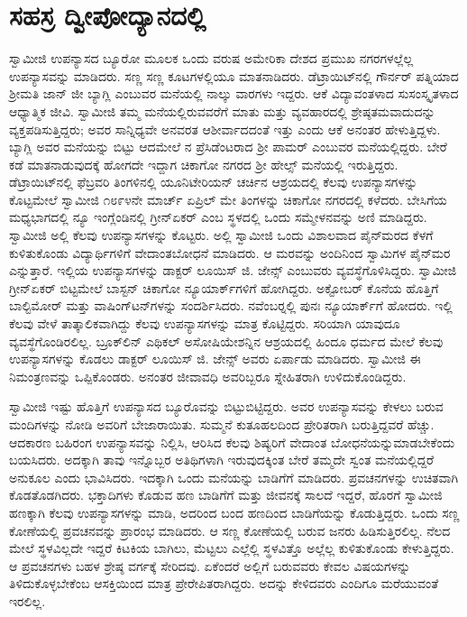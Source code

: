 
\chapter{ಸಹಸ್ರ ದ್ವೀಪೋದ್ಯಾನದಲ್ಲಿ}

 ಸ್ವಾಮೀಜಿ ಉಪನ್ಯಾಸದ ಬ್ಯೂರೋ ಮೂಲಕ ಒಂದು ವರುಷ ಅಮೇರಿಕಾ ದೇಶದ ಪ್ರಮುಖ ನಗರಗಳಲ್ಲೆಲ್ಲ ಉಪನ್ಯಾಸವನ್ನು ಮಾಡಿದರು. ಸಣ್ಣ ಸಣ್ಣ ಕೂಟಗಳಲ್ಲಿಯೂ ಮಾತನಾಡಿದರು. ಡೆಟ್ರಾಯಿಟ್‍ನಲ್ಲಿ ಗೌರ್ನರ್ ಪತ್ನಿಯಾದ ಶ‍್ರೀಮತಿ ಜಾನ್ ಜೀ ಬ್ಯಾಗ್ಲಿ ಎಂಬುವರ ಮನೆಯಲ್ಲಿ ನಾಲ್ಕು ವಾರಗಳು ಇದ್ದರು. ಆಕೆ ವಿದ್ಯಾವಂತಳಾದ ಸುಸಂಸ್ಕೃತಳಾದ ಆಧ್ಯಾತ್ಮಿಕ ಜೀವಿ. ಸ್ವಾಮೀಜಿ ತಮ್ಮ ಮನೆಯಲ್ಲಿರುವವರೆಗೆ ಮಾತು ಮತ್ತು ವ್ಯವಹಾರದಲ್ಲಿ ಶ್ರೇಷ್ಠತಮವಾದುದನ್ನು ವ್ಯಕ್ತಪಡಿಸುತ್ತಿದ್ದರು; ಅವರ ಸಾನ್ನಿಧ್ಯವೇ ಅನವರತ ಆಶೀರ್ವಾದದಂತೆ ಇತ್ತು ಎಂದು ಆಕೆ ಅನಂತರ ಹೇಳುತ್ತಿದ್ದಳು. ಬ್ಯಾಗ್ಲಿ ಅವರ ಮನೆಯನ್ನು ಬಿಟ್ಟು ಆದಮೇಲೆ ನ ಪ್ರೆಸಿಡೆಂಟರಾದ ಶ‍್ರೀ ಪಾಮರ್ ಎಂಬುವರ ಮನೆಯಲ್ಲಿದ್ದರು. ಬೇರೆ ಕಡೆ ಮಾತನಾಡುವುದಕ್ಕೆ ಹೋಗದೇ ಇದ್ದಾಗ ಚಿಕಾಗೋ ನಗರದ ಶ‍್ರೀ ಹೇಲ್ಸ್ ಮನೆಯಲ್ಲಿ ಇರುತ್ತಿದ್ದರು. ಡೆಟ್ರಾಯಿಟ್‍ನಲ್ಲಿ ಫೆಬ್ರವರಿ ತಿಂಗಳಿನಲ್ಲಿ ಯೂನಿಟೇರಿಯನ್ ಚರ್ಚಿನ ಆಶ್ರಯದಲ್ಲಿ ಕೆಲವು ಉಪನ್ಯಾಸಗಳನ್ನು ಕೊಟ್ಟಮೇಲೆ ಸ್ವಾಮೀಜಿ ೧೮೯೪ನೇ ಮಾರ್ಚ್ ಏಪ್ರಿಲ್ ಮೇ ತಿಂಗಳನ್ನು ಚಿಕಾಗೋ ನಗರದಲ್ಲಿ ಕಳೆದರು. ಬೇಸಿಗೆಯ ಮಧ್ಯಭಾಗದಲ್ಲಿ ನ್ಯೂ ಇಂಗ್ಲೆಂಡಿನಲ್ಲಿ ಗ್ರೀನ್‍ಏಕರ್ ಎಂಬ ಸ್ಥಳದಲ್ಲಿ ಒಂದು ಸಮ್ಮೇಳನವನ್ನು ಅಣಿ ಮಾಡಿದ್ದರು. ಸ್ವಾಮೀಜಿ ಅಲ್ಲಿ ಕೆಲವು ಉಪನ್ಯಾಸಗಳನ್ನು ಕೊಟ್ಟರು. ಅಲ್ಲಿ ಸ್ವಾಮೀಜಿ ಒಂದು ವಿಶಾಲವಾದ ಪೈನ್‍ಮರದ ಕೆಳಗೆ ಕುಳಿತುಕೊಂಡು ವಿದ್ಯಾರ್ಥಿಗಳಿಗೆ ವೇದಾಂತಬೋಧನೆ ಮಾಡಿದರು. ಆ ಮರವನ್ನು ಅಂದಿನಿಂದ ಸ್ವಾಮಿಗಳ ಪೈನ್‍ಮರ ಎನ್ನುತ್ತಾರೆ. ಇಲ್ಲಿಯ ಉಪನ್ಯಾಸಗಳನ್ನು ಡಾಕ್ಟರ್ ಲೂಯಿಸ್ ಜಿ. ಜೇನ್ಸ್ ಎಂಬುವರು ವ್ಯವಸ್ಥೆಗೊಳಿಸಿದ್ದರು. ಸ್ವಾಮೀಜಿ ಗ್ರೀನ್‍ಏಕರ್ ಬಿಟ್ಟಮೇಲೆ ಬಾಸ್ಟನ್ ಚಿಕಾಗೋ ನ್ಯೂಯಾರ್ಕ್‍ಗಳಿಗೆ ಹೋಗಿದ್ದರು. ಅಕ್ಟೋಬರ್ ಕೊನೆಯ ಹೊತ್ತಿಗೆ ಬಾಲ್ಟಿಮೋರ್ ಮತ್ತು ವಾಷಿಂಗ್‍ಟನ್‍ಗಳನ್ನು ಸಂದರ್ಶಿಸಿದರು. ನವೆಂಬರ್‍ನಲ್ಲಿ ಪುನಃ ನ್ಯೂಯಾರ್ಕ್‍ಗೆ ಹೋದರು. ಇಲ್ಲಿ ಕೆಲವು ವೇಳೆ ತಾತ್ಕಾಲಿಕವಾಗಿದ್ದು ಕೆಲವು ಉಪನ್ಯಾಸಗಳನ್ನು ಮಾತ್ರ ಕೊಟ್ಟಿದ್ದರು. ಸರಿಯಾಗಿ ಯಾವುದೂ ವ್ಯವಸ್ಥೆಗೊಂಡಿರಲಿಲ್ಲ. ಬ್ರೂಕ್‍ಲಿನ್ ಎಥಿಕಲ್ ಅಸೋಷಿಯೇಶನ್ನಿನ ಆಶ್ರಯದಲ್ಲಿ ಹಿಂದೂ ಧರ್ಮದ ಮೇಲೆ ಕೆಲವು ಉಪನ್ಯಾಸಗಳನ್ನು ಕೊಡಲು ಡಾಕ್ಟರ್ ಲೂಯಿಸ್ ಜಿ. ಜೇನ್ಸ್ ಅವರು ಏರ್ಪಾಡು ಮಾಡಿದರು. ಸ್ವಾಮೀಜಿ ಈ ನಿಮಂತ್ರಣವನ್ನು ಒಪ್ಪಿಕೊಂಡರು. ಅನಂತರ ಜೀವಾವಧಿ ಅವರಿಬ್ಬರೂ ಸ್ನೇಹಿತರಾಗಿ ಉಳಿದುಕೊಂಡಿದ್ದರು. 

 ಸ್ವಾಮೀಜಿ ಇಷ್ಟು ಹೊತ್ತಿಗೆ ಉಪನ್ಯಾಸದ ಬ್ಯೂರೊವನ್ನು ಬಿಟ್ಟುಬಿಟ್ಟಿದ್ದರು. ಅವರ ಉಪನ್ಯಾಸವನ್ನು ಕೇಳಲು ಬರುವ ಮಂದಿಗಳನ್ನು ನೋಡಿ ಅವರಿಗೆ ಬೇಜಾರಾಯಿತು. ಸುಮ್ಮನೆ ಕುತೂಹಲದಿಂದ ಪ್ರೇರಿತರಾಗಿ ಬರುತ್ತಿದ್ದವರೆ ಹೆಚ್ಚು. ಆದಕಾರಣ ಬಹಿರಂಗ ಉಪನ್ಯಾಸವನ್ನು ನಿಲ್ಲಿಸಿ, ಆರಿಸಿದ ಕೆಲವು ಶಿಷ್ಯರಿಗೆ ವೇದಾಂತ ಬೋಧನೆಯನ್ನು\break ಮಾಡಬೇಕೆಂದು ಬಯಸಿದರು. ಅದಕ್ಕಾಗಿ ತಾವು ಇನ್ನೊಬ್ಬರ ಅತಿಥಿಗಳಾಗಿ ಇರುವುದಕ್ಕಿಂತ ಬೇರೆ ತಮ್ಮದೇ ಸ್ವಂತ ಮನೆಯಲ್ಲಿದ್ದರೆ ಅನುಕೂಲ ಎಂದು ಭಾವಿಸಿದರು. ಇದಕ್ಕಾಗಿ ಒಂದು ಮನೆಯನ್ನು ಬಾಡಿಗೆಗೆ ಮಾಡಿದರು. ಪ್ರವಚನಗಳನ್ನು ಉಚಿತವಾಗಿ ಕೊಡತೊಡಗಿದರು. ಭಕ್ತಾದಿಗಳು ಕೊಡುವ ಹಣ ಬಾಡಿಗೆಗೆ ಮತ್ತು ಜೀವನಕ್ಕೆ ಸಾಲದೆ ಇದ್ದರೆ, ಹೊರಗೆ ಸ್ವಾಮೀಜಿ ಹಣಕ್ಕಾಗಿ ಕೆಲವು ಉಪನ್ಯಾಸಗಳನ್ನು ಮಾಡಿ, ಅದರಿಂದ ಬಂದ ಹಣದಿಂದ ಬಾಡಿಗೆಯನ್ನು ಕೊಡುತ್ತಿದ್ದರು. ಒಂದು ಸಣ್ಣ ಕೋಣೆಯಲ್ಲಿ ಪ್ರವಚನವನ್ನು ಪ್ರಾರಂಭ ಮಾಡಿದರು. ಆ ಸಣ್ಣ ಕೋಣೆಯಲ್ಲಿ ಬರುವ ಜನರು ಹಿಡಿಸುತ್ತಿರಲಿಲ್ಲ. ನೆಲದ ಮೇಲೆ ಸ್ಥಳವಿಲ್ಲದೇ ಇದ್ದರೆ ಕಿಟಕಿಯ ಬಾಗಿಲು, ಮೆಟ್ಟಲು ಎಲ್ಲೆಲ್ಲಿ ಸ್ಥಳವಿತ್ತೊ ಅಲ್ಲೆಲ್ಲ ಕುಳಿತುಕೊಂಡು ಕೇಳುತ್ತಿದ್ದರು. ಆ ಪ್ರವಚನಗಳು ಬಹಳ ಶ್ರೇಷ್ಠ ವರ್ಗಕ್ಕೆ ಸೇರಿದವು. ಏಕೆಂದರೆ ಅಲ್ಲಿಗೆ ಬರುವವರು ಕೇವಲ ವಿಷಯಗಳನ್ನು ತಿಳಿದುಕೊಳ್ಳಬೇಕೆಂಬ ಆಸಕ್ತಿಯಿಂದ ಮಾತ್ರ ಪ್ರೇರೇಪಿತರಾಗಿದ್ದರು. ಅದನ್ನು ಕೇಳಿದವರು ಎಂದಿಗೂ ಮರೆಯುವಂತೆ ಇರಲಿಲ್ಲ. 

